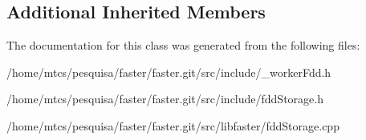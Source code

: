 \subsection*{Additional Inherited Members}


The documentation for this class was generated from the following files\+:\begin{DoxyCompactItemize}
\item 
/home/mtcs/pesquisa/faster/faster.\+git/src/include/\+\_\+worker\+Fdd.\+h\item 
/home/mtcs/pesquisa/faster/faster.\+git/src/include/fdd\+Storage.\+h\item 
/home/mtcs/pesquisa/faster/faster.\+git/src/libfaster/fdd\+Storage.\+cpp\end{DoxyCompactItemize}
